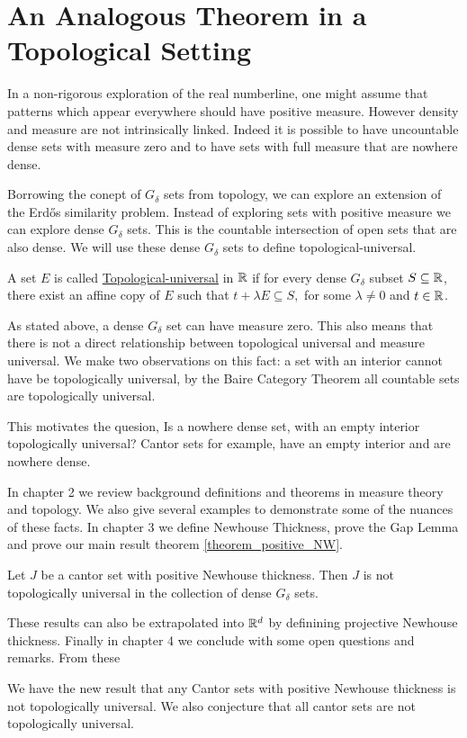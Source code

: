 \section{An Analogous Theorem in a Topological Setting}

In a non-rigorous exploration of the real numberline, one might assume that patterns which appear everywhere should have positive measure.  However density and measure are not intrinsically linked.  Indeed it is possible to have uncountable dense sets with measure zero and to have sets with full measure that are nowhere dense.  

Borrowing the conept of $G_\delta$ sets from topology, we can explore an extension of the Erd\H{o}s similarity problem.  Instead of exploring sets with positive measure we can explore dense $G_\delta$ sets.  This is the countable intersection of open sets that are also dense.  We will use these dense $G_\delta$ sets to define topological-universal. 

\begin{definition}
    A set $E$ is called \underline{Topological-universal} in $\mathbb{R}$ if for every dense $G_\delta$ subset $S \subseteq \mathbb{R}$, there exist an affine copy of $E$ such that $t+\lambda E \subseteq S,$ for some $\lambda \neq 0$ and $t \in \mathbb{R}$.  
\end{definition}

As stated above, a dense $G_\delta$ set can have measure zero.  This also means that there is not a direct relationship between topological universal and measure universal.  We make two observations on this fact: a set with an interior cannot have be topologically universal, by the Baire Category Theorem all countable sets are topologically universal.   

This motivates the quesion, Is a nowhere dense set, with an empty interior topologically universal?  Cantor sets for example, have an empty interior and are nowhere dense.  

In chapter 2 we review background definitions and theorems in measure theory and topology.  We also give several examples to demonstrate some of the nuances of these facts.  In chapter 3 we define Newhouse Thickness, prove the Gap Lemma and prove our main result theorem \ref{theorem_positive_NW}.

\begin{theorem*}
Let $J$ be a cantor set with positive Newhouse thickness.  Then $J$ is not topologically universal in the collection of dense $G_\delta$ sets.
\end{theorem*}

These results can also be extrapolated into $\mathbb{R}^d$ by definining projective Newhouse thickness.  Finally in chapter 4 we conclude with some open questions and remarks.  
From these

We have the new result that any Cantor sets with positive Newhouse thickness is not topologically universal.  We also conjecture that all cantor sets are not topologically universal.   

